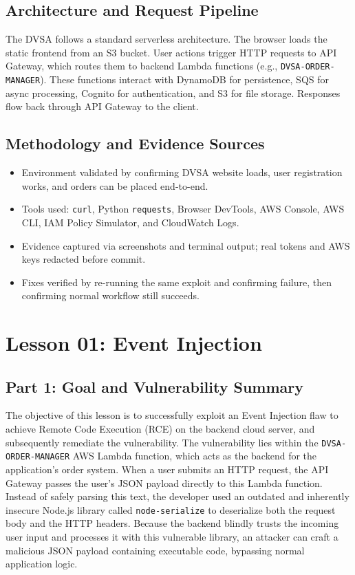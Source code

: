 \documentclass[12pt]{report}
\begin{document}
\section*{Architecture and Request Pipeline}
The DVSA follows a standard serverless architecture. The browser loads the static frontend from an S3 bucket. User actions trigger HTTP requests to API Gateway, which routes them to backend Lambda functions (e.g., \texttt{DVSA-ORDER-MANAGER}). These functions interact with DynamoDB for persistence, SQS for async processing, Cognito for authentication, and S3 for file storage. Responses flow back through API Gateway to the client.

\section*{Methodology and Evidence Sources}
\begin{itemize}
  \item Environment validated by confirming DVSA website loads, user registration works, and orders can be placed end-to-end.
  \item Tools used: \texttt{curl}, Python \texttt{requests}, Browser DevTools, AWS Console, AWS CLI, IAM Policy Simulator, and CloudWatch Logs.
  \item Evidence captured via screenshots and terminal output; real tokens and AWS keys redacted before commit.
  \item Fixes verified by re-running the same exploit and confirming failure, then confirming normal workflow still succeeds.
\end{itemize}

\clearpage
{}

\chapter{Lesson 01: Event Injection}

\section{Part 1: Goal and Vulnerability Summary}
The objective of this lesson is to successfully exploit an Event Injection flaw to achieve Remote Code Execution (RCE) on the backend cloud server, and subsequently remediate the vulnerability. The vulnerability lies within the \texttt{DVSA-ORDER-MANAGER} AWS Lambda function, which acts as the backend for the application's order system. When a user submits an HTTP request, the API Gateway passes the user's JSON payload directly to this Lambda function. Instead of safely parsing this text, the developer used an outdated and inherently insecure Node.js library called \texttt{node-serialize} to deserialize both the request body and the HTTP headers. Because the backend blindly trusts the incoming user input and processes it with this vulnerable library, an attacker can craft a malicious JSON payload containing executable code, bypassing normal application logic.
\end{document}
